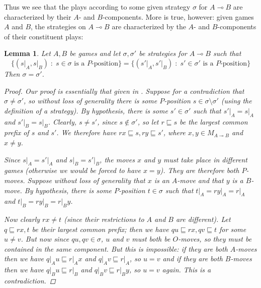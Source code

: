 \documentclass[11pt]{article} %
\theoremstyle{plain} %
\newtheorem{lemma}[theorem]{Lemma}
\theoremstyle{definition} %
\theoremstyle{note}
\theoremstyle{exercisestyle}
\renewcommand{\implies}{\multimap}
\newcommand{\suchthat}{\;\colon\;}
\newcommand{\prefix}{\sqsubseteq}
\begin{document}
Thus we see that the plays according to some given strategy $\sigma$ for $A\implies B$ are characterized by their $A$- and $B$-components.  More is true, however: given games $A$ and $B$, the strategies on $A\implies B$ are characterized by the $A$- and $B$-components of their constituent plays:
\begin{lemma}
  \label{HylandSchalkFaithful}
  Let $A,B$ be games and let $\sigma,\sigma'$ be strategies for $A\implies B$ such that
  \[
    \{(s\vert_A,s\vert_B)\suchthat \textrm{$s\in\sigma$ is a $P$-position}\}=\{(s'\vert_A,s'\vert_B)\suchthat\textrm{$s'\in\sigma'$ is a $P$-position}\}
    \]
  Then $\sigma=\sigma'$.
  \begin{proof}
    Our proof is essentially that given in \cite{CalderonMcCusker}.  Suppose for a contradiction that $\sigma\ne\sigma'$, so without loss of generality there is some $P$-position $s\in\sigma\setminus\sigma'$ (using the definition of a strategy).  By hypothesis, there is some $s'\in\sigma'$ such that $s'\vert_A=s\vert_A$ and $s'\vert_B=s\vert_B$.  Clearly, $s\ne s'$, since $s\not\in\sigma'$, so let $r\prefix s$ be the largest common prefix of $s$ and $s'$.  We therefore have $rx\prefix s,ry\prefix s'$, where $x,y\in M_{A\implies B}$ and $x\ne y$.  

    Since $s\vert_A=s'\vert_A$ and $s\vert_B=s'\vert_B$, the moves $x$ and $y$ must take place in different games (otherwise we would be forced to have $x=y$).  They are therefore both $P$-moves.  Suppose without loss of generality that $x$ is an $A$-move and that $y$ is a $B$-move.  By hypothesis, there is some $P$-position $t\in\sigma$ such that $t\vert_A=ry\vert_A=r\vert_A$ and $t\vert_B=ry\vert_B=r\vert_By$.

    Now clearly $rx\ne t$ (since their restrictions to $A$ and $B$ are different).  Let $q\prefix rx, t$ be their largest common prefix; then we have $qu\prefix rx, qv\prefix t$ for some $u\ne v$.  But now since $qu, qv\in\sigma$, $u$ and $v$ must both be $O$-moves, so they must be contained in the same component.  But this is impossible: if they are both $A$-moves then we have $q\vert_Au\prefix r\vert_Ax$ and $q\vert_Av\prefix r\vert_A$, so $u=v$ and if they are both $B$-moves then we have $q\vert_Bu\prefix r\vert_B$ and $q\vert_Bv\prefix r\vert_By$, so $u=v$ again.  This is a contradiction.
  \end{proof}
\end{lemma}
\end{document}
